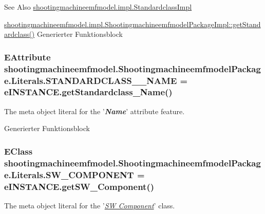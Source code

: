 \begin{DoxySeeAlso}{See Also}
\hyperlink{classshootingmachineemfmodel_1_1impl_1_1_standardclass_impl}{shootingmachineemfmodel.\-impl.\-Standardclass\-Impl} 

\hyperlink{classshootingmachineemfmodel_1_1impl_1_1_shootingmachineemfmodel_package_impl_a5fd188e97c85df36a65343bbd588bb31}{shootingmachineemfmodel.\-impl.\-Shootingmachineemfmodel\-Package\-Impl\-::get\-Standardclass()} Generierter Funktionsblock 
\end{DoxySeeAlso}
\hypertarget{interfaceshootingmachineemfmodel_1_1_shootingmachineemfmodel_package_1_1_literals_aa9fb7c83a73b8783944eaf8463d2626f}{
\subsubsection[{S\-T\-A\-N\-D\-A\-R\-D\-C\-L\-A\-S\-S\-\_\-\-\_\-\-N\-A\-M\-E}]{\setlength{\rightskip}{0pt plus 5cm}E\-Attribute shootingmachineemfmodel.\-Shootingmachineemfmodel\-Package.\-Literals.\-S\-T\-A\-N\-D\-A\-R\-D\-C\-L\-A\-S\-S\-\_\-\-\_\-\-N\-A\-M\-E = e\-I\-N\-S\-T\-A\-N\-C\-E.\-get\-Standardclass\-\_\-\-Name()}}\label{interfaceshootingmachineemfmodel_1_1_shootingmachineemfmodel_package_1_1_literals_aa9fb7c83a73b8783944eaf8463d2626f}
The meta object literal for the '{\itshape {\bfseries Name}}' attribute feature.

Generierter Funktionsblock \hypertarget{interfaceshootingmachineemfmodel_1_1_shootingmachineemfmodel_package_1_1_literals_a4efac8ee87bb281dc7448e386107964d}{
\subsubsection[{S\-W\-\_\-\-C\-O\-M\-P\-O\-N\-E\-N\-T}]{\setlength{\rightskip}{0pt plus 5cm}E\-Class shootingmachineemfmodel.\-Shootingmachineemfmodel\-Package.\-Literals.\-S\-W\-\_\-\-C\-O\-M\-P\-O\-N\-E\-N\-T = e\-I\-N\-S\-T\-A\-N\-C\-E.\-get\-S\-W\-\_\-\-Component()}}\label{interfaceshootingmachineemfmodel_1_1_shootingmachineemfmodel_package_1_1_literals_a4efac8ee87bb281dc7448e386107964d}
The meta object literal for the '\hyperlink{classshootingmachineemfmodel_1_1impl_1_1_s_w___component_impl}{{\itshape S\-W Component}}' class.

